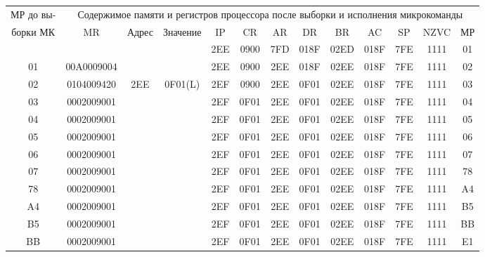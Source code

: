 \small{
    \begin{flushleft}
        \begin{tabular}{|c|c|c|c|c|c|c|c|c|c|c|c|c|}
            \hline
            МР до вы- & \multicolumn{12}{1}{Содержимое памяти и регистров процессора после выборки и исполнения микрокоманды} \\
            \cline{2-13}
            борки МК & MR         & Адрес & Значение & IP  & CR   & AR  & DR   & BR   & AC   & SP  & NZVC & МР \\
            \hline
            &            &       &          & 2EE & 0900 & 7FD & 018F & 02ED & 018F & 7FE & 1111 & 01 \\
            \hline
            01       & 00A0009004 &       &          & 2EE & 0900 & 2EE & 018F & 02EE & 018F & 7FE & 1111 & 02 \\
            \hline
            02       & 0104009420 & 2EE   & 0F01(L)  & 2EF & 0900 & 2EE & 0F01 & 02EE & 018F & 7FE & 1111 & 03 \\
            \hline
            03       & 0002009001 &       &          & 2EF & 0F01 & 2EE & 0F01 & 02EE & 018F & 7FE & 1111 & 04 \\
            \hline
            04       & 0002009001 &       &          & 2EF & 0F01 & 2EE & 0F01 & 02EE & 018F & 7FE & 1111 & 05 \\
            \hline
            05       & 0002009001 &       &          & 2EF & 0F01 & 2EE & 0F01 & 02EE & 018F & 7FE & 1111 & 06 \\
            \hline
            06       & 0002009001 &       &          & 2EF & 0F01 & 2EE & 0F01 & 02EE & 018F & 7FE & 1111 & 07 \\
            \hline
            07       & 0002009001 &       &          & 2EF & 0F01 & 2EE & 0F01 & 02EE & 018F & 7FE & 1111 & 78 \\
            \hline
            78       & 0002009001 &       &          & 2EF & 0F01 & 2EE & 0F01 & 02EE & 018F & 7FE & 1111 & A4 \\
            \hline
            A4       & 0002009001 &       &          & 2EF & 0F01 & 2EE & 0F01 & 02EE & 018F & 7FE & 1111 & B5 \\
            \hline
            B5       & 0002009001 &       &          & 2EF & 0F01 & 2EE & 0F01 & 02EE & 018F & 7FE & 1111 & BB \\
            \hline
            BB       & 0002009001 &       &          & 2EF & 0F01 & 2EE & 0F01 & 02EE & 018F & 7FE & 1111 & E1 \\
            \hline

\end{tabular}
\end{flushleft}}

